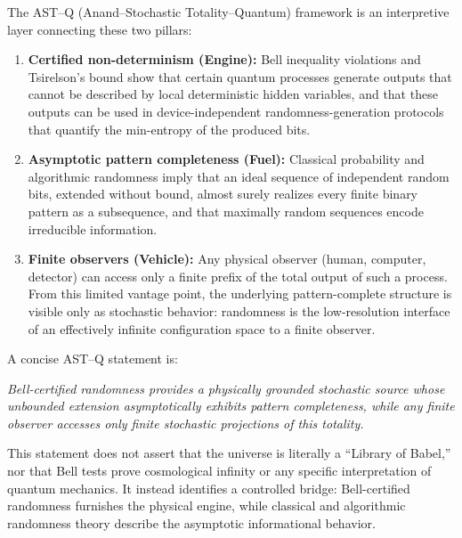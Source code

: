 \documentclass[11pt]{article}
\begin{document}
The AST--Q (Anand--Stochastic Totality--Quantum) framework is an interpretive layer connecting these two pillars:
\begin{enumerate}
  \item \textbf{Certified non-determinism (Engine):} Bell inequality violations and Tsirelson's bound show that certain quantum processes generate outputs that cannot be described by local deterministic hidden variables, and that these outputs can be used in device-independent randomness-generation protocols that quantify the min-entropy of the produced bits.

  \item \textbf{Asymptotic pattern completeness (Fuel):} Classical probability and algorithmic randomness imply that an ideal sequence of independent random bits, extended without bound, almost surely realizes every finite binary pattern as a subsequence, and that maximally random sequences encode irreducible information.

  \item \textbf{Finite observers (Vehicle):} Any physical observer (human, computer, detector) can access only a finite prefix of the total output of such a process. From this limited vantage point, the underlying pattern-complete structure is visible only as stochastic behavior: randomness is the low-resolution interface of an effectively infinite configuration space to a finite observer.
\end{enumerate}

A concise AST--Q statement is:

\medskip
\noindent
\emph{Bell-certified randomness provides a physically grounded stochastic source whose unbounded extension asymptotically exhibits pattern completeness, while any finite observer accesses only finite stochastic projections of this totality.}

\medskip
This statement does not assert that the universe is literally a ``Library of Babel,'' nor that Bell tests prove cosmological infinity or any specific interpretation of quantum mechanics. It instead identifies a controlled bridge: Bell-certified randomness furnishes the physical engine, while classical and algorithmic randomness theory describe the asymptotic informational behavior.
\end{document}
